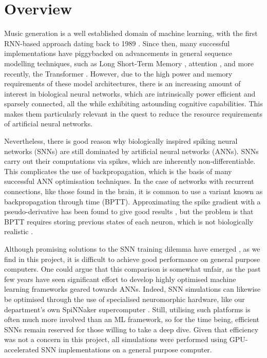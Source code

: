 \documentclass[../../report.tex]{subfiles}
\begin{document}
\section{Overview}

Music generation is a well established domain of machine learning, with the
first RNN-based approach dating back to 1989 \cite{Todd1989}. Since then, many
successful implementations have piggybacked on advancements in general sequence
modelling techniques, such as Long Short-Term Memory \cite{Eck2002}, attention
\cite{Waite2016}, and more recently, the Transformer \cite{Huang2018}. However,
due to the high power and memory requirements of these model architectures,
there is an increasing amount of interest in biological neural networks, which
are intrinsically power efficient and sparsely connected, all the while
exhibiting astounding cognitive capabilities. This makes them particularly
relevant in the quest to reduce the resource requirements of artificial neural
networks.

Nevertheless, there is good reason why biologically inspired spiking neural
networks (SNNs) are still dominated by artificial neural networks (ANNs). SNNs
carry out their computations via spikes, which are inherently
non-differentiable. This complicates the use of backpropagation, which is the
basis of many successful ANN optimisation techniques. In the case of networks
with recurrent connections, like those found in the brain, it is common to use a
variant known as backpropagation through time (BPTT). Approximating the spike
gradient with a pseudo-derivative has been found to give good results
\cite{Bellec2018LSNN}, but the problem is that BPTT requires storing previous
states of each neuron, which is not biologically realistic \cite{Lillicrap2019}.

Although promising solutions to the SNN training dilemma have emerged
\cite{Bellec2020}, as we find in this project, it is difficult to achieve good
performance on general purpose computers. One could argue that this comparison
is somewhat unfair, as the past few years have seen significant effort to
develop highly optimised machine learning frameworks geared towards ANNs.
Indeed, SNN simulations can likewise be optimised through the use of specialised
neuromorphic hardware, like our department's own SpiNNaker supercomputer
\cite{Furber2014}. Still, utilising such platforms is often much more involved
than an ML framework, so for the time being, efficient SNNs remain reserved for
those willing to take a deep dive. Given that efficiency was not a concern in
this project, all simulations were performed using GPU-accelerated SNN
implementations on a general purpose computer.
\end{document}
